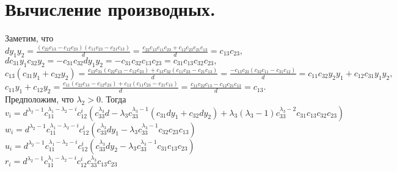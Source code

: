 \documentclass[12pt]{article}
\begin{document}
\section*{Вычисление производных.}

Заметим, что
\\
$ d y_1 y_2 = \frac{ (c_{22}c_{13} - c_{12}c_{23}) (c_{11}c_{23} - c_{21}c_{13}) }{d} = \frac{ c_{22}c_{13}c_{11}c_{23} + c_{12}c_{23}c_{21}c_{13} }{d} = c_{13}c_{23}, $
\\
$ d c_{31} y_1 c_{32} y_2 = - c_{31}c_{32} d y_1 y_2 = - c_{31}c_{32}c_{13}c_{23} = c_{31}c_{13}c_{32}c_{23}, $
\\
$ c_{13} (c_{31} y_1 + c_{32} y_2) = \frac{c_{13}c_{31} (c_{22}c_{13} - c_{12}c_{23}) + c_{13}c_{32} (c_{11}c_{23} - c_{21}c_{13}) }{d} = \frac{-c_{13}c_{23} (c_{32}c_{11} - c_{31}c_{12})}{d} = c_{11} c_{32} y_2 y_1 + c_{12}c_{31} y_1 y_2, $
\\
$ c_{11} y_1 + c_{12} y_2 = \frac{c_{11} (c_{22}c_{13} - c_{12}c_{23}) + c_{12} (c_{11}c_{23} - c_{21}c_{13}) }{d} = 
\frac{ c_{11}c_{22}c_{13} - c_{12}c_{21}c_{13} }{d} = c_{13}. $
\\



Предположим, что $\lambda_2 > 0$. Тогда
\\
$ v_i = d^{\lambda_2 - 1} c_{11}^{\lambda_1 - \lambda_2 - i} c_{12}^i (c_{33}^{\lambda_3} d - \lambda_3 c_{33}^{\lambda_3 - 1} (c_{31} d y_1 + c_{32} d y_2) + \lambda_3 (\lambda_3 - 1) c_{33}^{\lambda_3 - 2} c_{31}c_{13}c_{32}c_{23}) $
\\
$ w_i = d^{\lambda_2 - 1} c_{11}^{\lambda_1 - \lambda_2 - i} c_{12}^i (c_{33}^{\lambda_3} d y_1 - \lambda_3 c_{33}^{\lambda_3 - 1} c_{32}c_{23}c_{13}) $
\\
$ u_i = d^{\lambda_2 - 1} c_{11}^{\lambda_1 - \lambda_2 - i} c_{12}^i (c_{33}^{\lambda_3} d y_2 - \lambda_3 c_{33}^{\lambda_3 - 1} c_{31}c_{13}c_{23}) $
\\
$ r_i = d^{\lambda_2 - 1} c_{11}^{\lambda_1 - \lambda_2 - i} c_{12}^i c_{33}^{\lambda_3} c_{13}c_{23} $
\newline


\newline


\newline


\newline


\end{document}
